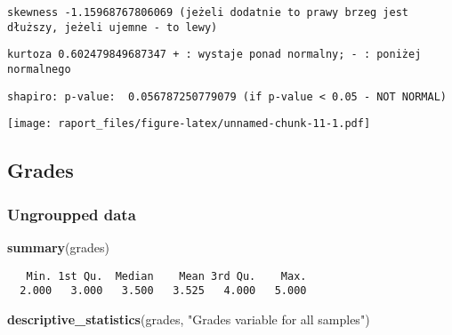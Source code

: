 \documentclass[]{article}
\newenvironment{Shaded}{\begin{snugshade}}{\end{snugshade}}
\newcommand{\KeywordTok}[1]{\textcolor[rgb]{0.13,0.29,0.53}{\textbf{{#1}}}}
\newcommand{\StringTok}[1]{\textcolor[rgb]{0.31,0.60,0.02}{{#1}}}
\newcommand{\NormalTok}[1]{{#1}}
\begin{document}
\begin{verbatim}
skewness -1.15968767806069 (jeżeli dodatnie to prawy brzeg jest dłuższy, jeżeli ujemne - to lewy)
\end{verbatim}

\begin{verbatim}
kurtoza 0.602479849687347 + : wystaje ponad normalny; - : poniżej normalnego
\end{verbatim}

\begin{verbatim}
shapiro: p-value:  0.056787250779079 (if p-value < 0.05 - NOT NORMAL)
\end{verbatim}

\texttt{[image: raport\_files/figure-latex/unnamed-chunk-11-1.pdf]}

\subsection{Grades}\label{grades}

\begin{Shaded}
\end{Shaded}

\subsubsection{Ungroupped data}\label{ungroupped-data}

\begin{Shaded}
\begin{Highlighting}[]
\KeywordTok{summary}\NormalTok{(grades)}
\end{Highlighting}
\end{Shaded}

\begin{verbatim}
   Min. 1st Qu.  Median    Mean 3rd Qu.    Max. 
  2.000   3.000   3.500   3.525   4.000   5.000 
\end{verbatim}

\begin{Shaded}
\begin{Highlighting}[]
\KeywordTok{descriptive_statistics}\NormalTok{(grades, }\StringTok{"Grades variable for all samples"}\NormalTok{)}
\end{Highlighting}
\end{Shaded}
\end{document}
